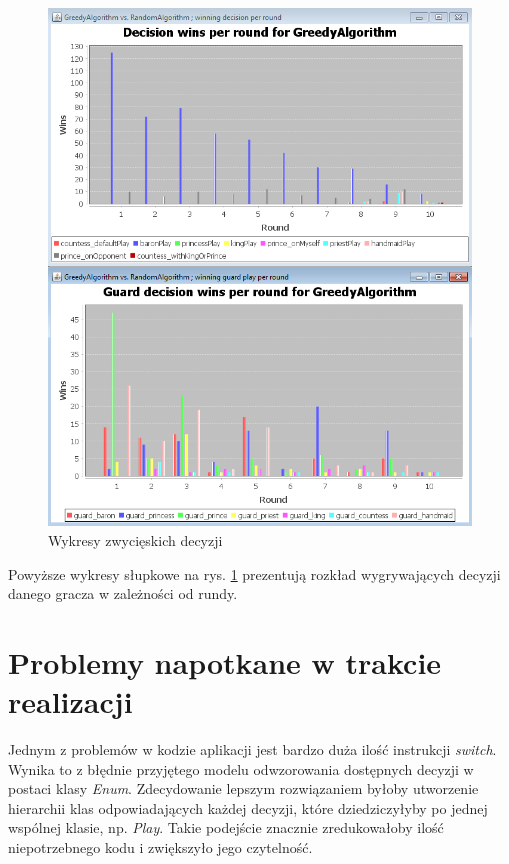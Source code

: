 \begin{figure}[H]
	\centering
	\includegraphics[width=\textwidth]{Resources/decisionWinsPerRoundChart.PNG}
	\caption{Wykresy zwycięskich decyzji} 
	\label{fig:decisionChart}
\end{figure}

Powyższe wykresy słupkowe na rys. \ref{fig:decisionChart} prezentują rozkład wygrywających decyzji danego gracza w zależności od rundy.

\section{Problemy napotkane w trakcie realizacji}
Jednym z problemów w kodzie aplikacji jest bardzo duża ilość instrukcji \textit{switch}. Wynika to z błędnie przyjętego modelu odwzorowania dostępnych decyzji w postaci klasy \textit{Enum}. Zdecydowanie lepszym rozwiązaniem byłoby utworzenie hierarchii klas odpowiadających każdej decyzji, które dziedziczyłyby po jednej wspólnej klasie, np. \textit{Play}. Takie podejście znacznie zredukowałoby ilość niepotrzebnego kodu i zwiększyło jego czytelność.


